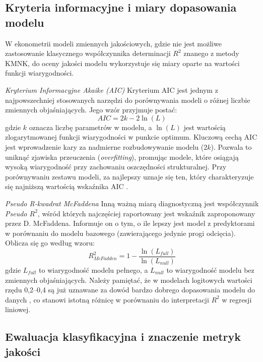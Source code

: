 \subsection{Kryteria informacyjne i miary dopasowania modelu}

W ekonometrii modeli zmiennych jakościowych, gdzie nie jest możliwe zastosowanie klasycznego współczynnika determinacji $R^2$ znanego z metody KMNK, do oceny jakości modelu wykorzystuje się miary oparte na wartości funkcji wiarygodności.

\textit{Kryterium Informacyjne Akaike (AIC)}
Kryterium AIC jest jednym z najpowszechniej stosowanych narzędzi do porównywania modeli o różnej liczbie zmiennych objaśniających. Jego wzór przyjmuje postać:
\begin{equation}
    AIC = 2k - 2\ln(L)
\end{equation}
gdzie $k$ oznacza liczbę parametrów w modelu, a $\ln(L)$ jest wartością zlogarytmowanej funkcji wiarygodności w punkcie optimum. Kluczową cechą AIC jest wprowadzenie kary za nadmierne rozbudowywanie modelu ($2k$). Pozwala to uniknąć zjawiska przeuczenia (\textit{overfitting}), promując modele, które osiągają wysoką wiarygodność przy zachowaniu oszczędności strukturalnej. Przy porównywaniu zestawu modeli, za najlepszy uznaje się ten, który charakteryzuje się najniższą wartością wskaźnika AIC \cite{greene2003}.

\textit{Pseudo R-kwadrat McFaddena}
Inną ważną miarą diagnostyczną jest współczynnik \textit{Pseudo $R^2$}, wśród których najczęściej raportowany jest wskaźnik zaproponowany przez D. McFaddena. Informuje on o tym, o ile lepszy jest model z predyktorami w porównaniu do modelu bazowego (zawierającego jedynie progi odcięcia). Oblicza się go według wzoru:
\begin{equation}
    R^2_{McFadden} = 1 - \frac{\ln(L_{full})}{\ln(L_{null})}
\end{equation}
gdzie $L_{full}$ to wiarygodność modelu pełnego, a $L_{null}$ to wiarygodność modelu bez zmiennych objaśniających. Należy pamiętać, że w modelach logitowych wartości rzędu 0,2--0,4 są już uznawane za dowód bardzo dobrego dopasowania modelu do danych \cite{maddala1983}, co stanowi istotną różnicę w porównaniu do interpretacji $R^2$ w regresji liniowej.

\subsection{Ewaluacja klasyfikacyjna i znaczenie metryk jakości}

